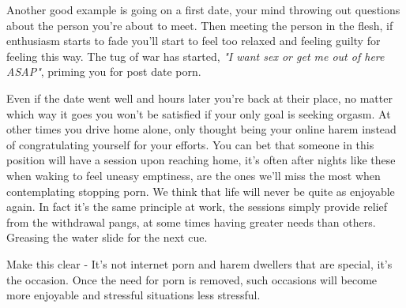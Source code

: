 \documentclass[easypeasy.tex]{subfiles}
\begin{document}
Another good example is going on a first date, your mind throwing out questions about the person you're about to meet. Then meeting the person in the flesh, if enthusiasm starts to fade you'll start to feel too relaxed and feeling guilty for feeling this way. The tug of war has started, \textit{"I want sex or get me out of here ASAP"}, priming you for post date porn.

Even if the date went well and hours later you're back at their place, no matter which way it goes you won't be satisfied if your only goal is seeking orgasm. At other times you drive home alone, only thought being your online harem instead of congratulating yourself for your efforts. You can bet that someone in this position will have a session upon reaching home, it's often after nights like these when waking to feel uneasy emptiness, are the ones we'll miss the most when contemplating stopping porn. We think that life will never be quite as enjoyable again. In fact it's the same principle at work, the sessions simply provide relief from the withdrawal pangs, at some times having greater needs than others. Greasing the water slide for the next cue.

Make this clear - It's not internet porn and harem dwellers that are special, it's the occasion. Once the need for porn is removed, such occasions will become more enjoyable and stressful situations less stressful.
\end{document}
